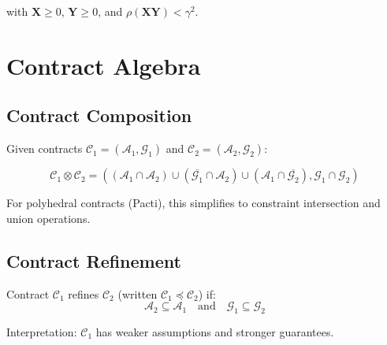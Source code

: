 with $\mathbf{X} \geq 0$, $\mathbf{Y} \geq 0$, and $\rho(\mathbf{X}\mathbf{Y}) < \gamma^2$.

\section{Contract Algebra}

\subsection{Contract Composition}

Given contracts $\mathcal{C}_1 = (\mathcal{A}_1, \mathcal{G}_1)$ and $\mathcal{C}_2 = (\mathcal{A}_2, \mathcal{G}_2)$:

\begin{equation}
    \mathcal{C}_1 \otimes \mathcal{C}_2 = \left(
        (\mathcal{A}_1 \cap \mathcal{A}_2) \cup (\overline{\mathcal{G}_1} \cap \mathcal{A}_2) \cup (\mathcal{A}_1 \cap \overline{\mathcal{G}_2}),
        \mathcal{G}_1 \cap \mathcal{G}_2
    \right)
\end{equation}

For polyhedral contracts (Pacti), this simplifies to constraint intersection and union operations.

\subsection{Contract Refinement}

Contract $\mathcal{C}_1$ refines $\mathcal{C}_2$ (written $\mathcal{C}_1 \preceq \mathcal{C}_2$) if:
\begin{equation}
    \mathcal{A}_2 \subseteq \mathcal{A}_1 \quad \text{and} \quad \mathcal{G}_1 \subseteq \mathcal{G}_2
\end{equation}

Interpretation: $\mathcal{C}_1$ has weaker assumptions and stronger guarantees.

